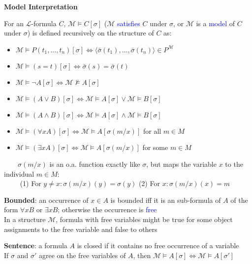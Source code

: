 \documentclass[7pt,landscape]{article}
\begin{document}
\begin{multicols}{2}
\textbf{Model Interpretation}

For an $\mathcal{L}$-formula $C$, $\mathcal{M} \vDash C \left[ \sigma \right]$ ($\mathcal{M}$ \textcolor{blue}{satisfies} $C$ under $\sigma$, or $\mathcal{M}$ is a \textcolor{blue}{model} of $C$ under $\sigma$) is defined recursively on the structure of $C$ as:

\begin{itemize}
    \item $\mathcal{M} \vDash P(t_1, ..., t_n) \left[ \sigma \right] \iff \langle \bar{\sigma} (t_1), ..., \bar{\sigma}(t_n) \rangle \in P^{\mathcal{M}}$
    \item $\mathcal{M} \vDash (s = t) \left[ \sigma \right] \iff \bar{\sigma}(s) = \bar{\sigma} (t)$
    \item $\mathcal{M} \vDash \neg A \left[ \sigma \right] \iff \mathcal{M} \nvDash A \left[ \sigma \right]$
    \item $\mathcal{M} \vDash (A \lor B) \left[ \sigma \right] \iff \mathcal{M} \vDash A \left[ \sigma \right] \lor \mathcal{M} \vDash B \left[ \sigma \right]$
    \item $\mathcal{M} \vDash (A \land B) \left[ \sigma \right] \iff \mathcal{M} \vDash A \left[ \sigma \right] \land \mathcal{M} \vDash B \left[ \sigma \right]$
    \item $\mathcal{M} \vDash (\forall x A) \left[ \sigma \right] \iff \mathcal{M} \vDash A \left[ \sigma (m/x) \right]$ for all $m \in M$
    \item $\mathcal{M} \vDash (\exists x A) \left[ \sigma \right] \iff \mathcal{M} \vDash A \left[ \sigma (m/x) \right]$ for some $m \in M$
\end{itemize}

$\quad\quad \sigma(m/x)$ is an o.a. function exactly like $\sigma$, but maps the variable $x$ to the individual $m \in M$:  \\
$\quad\quad$ (1) For $y \neq x: \sigma(m/x) (y) = \sigma(y)$
(2) For $x: \sigma(m/x) (x) = m$

\textbf{Bounded}: an occurrence of $x \in A$ is bounded iff it is an sub-formula of $A$ of the form $\forall x B$ or $\exists x B$; otherwise the occurrence is \textcolor{blue}{free} \\
In a structure $\mathcal{M}$, formula with free variables might be true for some object assignments to the free variable and false to others

\textbf{Sentence}: a formula $A$ is closed if it contains no free occurrence of a variable \\
If $\sigma$ and $\sigma'$ agree on the free variables of $A$, then $\mathcal{M} \vDash A \left[ \sigma \right] \iff \mathcal{M} \vDash A \left[ \sigma' \right]$


\end{multicols}
\end{document}
